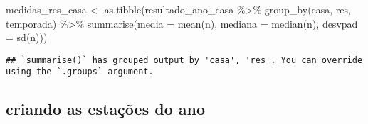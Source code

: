 \documentclass[
]{article}
\newenvironment{Shaded}{\begin{snugshade}}{\end{snugshade}}
\newcommand{\FunctionTok}[1]{\textcolor[rgb]{0.00,0.00,0.00}{#1}}
\newcommand{\NormalTok}[1]{#1}
\newcommand{\OtherTok}[1]{\textcolor[rgb]{0.56,0.35,0.01}{#1}}
\newcommand{\SpecialCharTok}[1]{\textcolor[rgb]{0.00,0.00,0.00}{#1}}
\newcommand{\StringTok}[1]{\textcolor[rgb]{0.31,0.60,0.02}{#1}}
\begin{document}
\begin{Shaded}
\begin{Highlighting}[]
\NormalTok{medidas\_res\_casa }\OtherTok{\textless{}{-}} \FunctionTok{as.tibble}\NormalTok{(resultado\_ano\_casa }\SpecialCharTok{\%\textgreater{}\%} \FunctionTok{group\_by}\NormalTok{(casa, res, temporada) }\SpecialCharTok{\%\textgreater{}\%} 
                      \FunctionTok{summarise}\NormalTok{(}\StringTok{\textquotesingle{}media\textquotesingle{}} \OtherTok{=} \FunctionTok{mean}\NormalTok{(n),}
                                \StringTok{\textquotesingle{}mediana\textquotesingle{}} \OtherTok{=} \FunctionTok{median}\NormalTok{(n),}
                                \StringTok{\textquotesingle{}desvpad\textquotesingle{}} \OtherTok{=} \FunctionTok{sd}\NormalTok{(n)))}
\end{Highlighting}
\end{Shaded}

\begin{verbatim}
## `summarise()` has grouped output by 'casa', 'res'. You can override using the `.groups` argument.
\end{verbatim}

\hypertarget{criando-as-estauxe7uxf5es-do-ano}{%
\subsection{criando as estações do
ano}\label{criando-as-estauxe7uxf5es-do-ano}}
\end{document}
